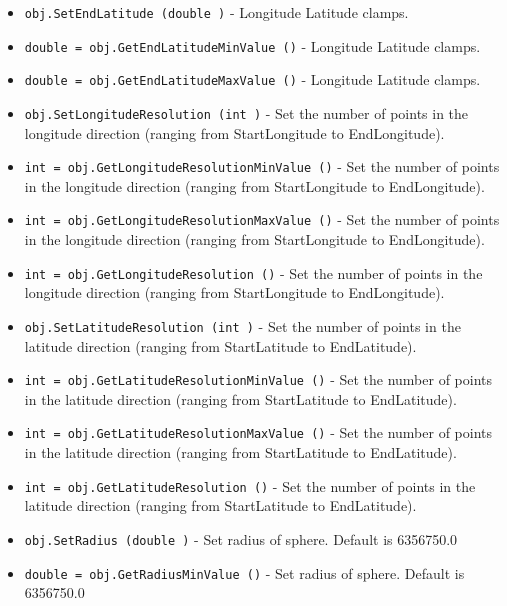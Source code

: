 \begin{itemize}
\item  \verb|obj.SetEndLatitude (double )| -  Longitude Latitude clamps.

\item  \verb|double = obj.GetEndLatitudeMinValue ()| -  Longitude Latitude clamps.

\item  \verb|double = obj.GetEndLatitudeMaxValue ()| -  Longitude Latitude clamps.

\item  \verb|obj.SetLongitudeResolution (int )| -  Set the number of points in the longitude direction (ranging from
 StartLongitude to EndLongitude).

\item  \verb|int = obj.GetLongitudeResolutionMinValue ()| -  Set the number of points in the longitude direction (ranging from
 StartLongitude to EndLongitude).

\item  \verb|int = obj.GetLongitudeResolutionMaxValue ()| -  Set the number of points in the longitude direction (ranging from
 StartLongitude to EndLongitude).

\item  \verb|int = obj.GetLongitudeResolution ()| -  Set the number of points in the longitude direction (ranging from
 StartLongitude to EndLongitude).

\item  \verb|obj.SetLatitudeResolution (int )| -  Set the number of points in the latitude direction (ranging
 from StartLatitude to EndLatitude).

\item  \verb|int = obj.GetLatitudeResolutionMinValue ()| -  Set the number of points in the latitude direction (ranging
 from StartLatitude to EndLatitude).

\item  \verb|int = obj.GetLatitudeResolutionMaxValue ()| -  Set the number of points in the latitude direction (ranging
 from StartLatitude to EndLatitude).

\item  \verb|int = obj.GetLatitudeResolution ()| -  Set the number of points in the latitude direction (ranging
 from StartLatitude to EndLatitude).

\item  \verb|obj.SetRadius (double )| -  Set radius of sphere. Default is 6356750.0

\item  \verb|double = obj.GetRadiusMinValue ()| -  Set radius of sphere. Default is 6356750.0


\end{itemize}
